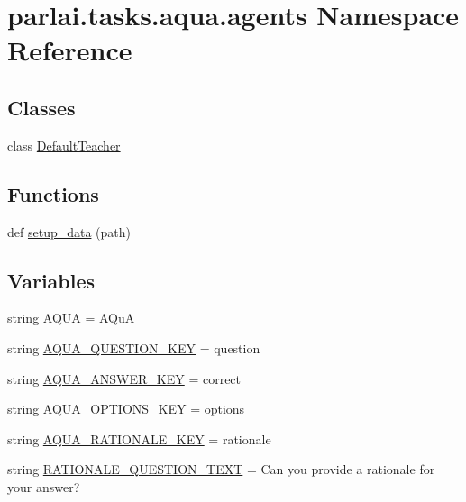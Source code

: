 \hypertarget{namespaceparlai_1_1tasks_1_1aqua_1_1agents}{}\section{parlai.\+tasks.\+aqua.\+agents Namespace Reference}
\label{namespaceparlai_1_1tasks_1_1aqua_1_1agents}
\subsection*{Classes}
\begin{DoxyCompactItemize}
\item 
class \hyperlink{classparlai_1_1tasks_1_1aqua_1_1agents_1_1DefaultTeacher}{Default\+Teacher}
\end{DoxyCompactItemize}
\subsection*{Functions}
\begin{DoxyCompactItemize}
\item 
def \hyperlink{namespaceparlai_1_1tasks_1_1aqua_1_1agents_a2d4e9f4e80d4edc0646c7e3d52be9f25}{setup\+\_\+data} (path)
\end{DoxyCompactItemize}
\subsection*{Variables}
\begin{DoxyCompactItemize}
\item 
string \hyperlink{namespaceparlai_1_1tasks_1_1aqua_1_1agents_ac1c607195fc8111cc32f83b710ae8ef8}{A\+Q\+UA} = \textquotesingle{}A\+QuA\textquotesingle{}
\item 
string \hyperlink{namespaceparlai_1_1tasks_1_1aqua_1_1agents_a6f4c29dfe00fcd7528ddc9f202dd71fc}{A\+Q\+U\+A\+\_\+\+Q\+U\+E\+S\+T\+I\+O\+N\+\_\+\+K\+EY} = \textquotesingle{}question\textquotesingle{}
\item 
string \hyperlink{namespaceparlai_1_1tasks_1_1aqua_1_1agents_af48618b7d7d59964edc4f51d6171f034}{A\+Q\+U\+A\+\_\+\+A\+N\+S\+W\+E\+R\+\_\+\+K\+EY} = \textquotesingle{}correct\textquotesingle{}
\item 
string \hyperlink{namespaceparlai_1_1tasks_1_1aqua_1_1agents_acbdbdda0de0642b8b977ef5638b21215}{A\+Q\+U\+A\+\_\+\+O\+P\+T\+I\+O\+N\+S\+\_\+\+K\+EY} = \textquotesingle{}options\textquotesingle{}
\item 
string \hyperlink{namespaceparlai_1_1tasks_1_1aqua_1_1agents_a03e0e9f2c5cb044de64f5cad4060a386}{A\+Q\+U\+A\+\_\+\+R\+A\+T\+I\+O\+N\+A\+L\+E\+\_\+\+K\+EY} = \textquotesingle{}rationale\textquotesingle{}
\item 
string \hyperlink{namespaceparlai_1_1tasks_1_1aqua_1_1agents_ab8474fa8e49958fff8955f9a49da2535}{R\+A\+T\+I\+O\+N\+A\+L\+E\+\_\+\+Q\+U\+E\+S\+T\+I\+O\+N\+\_\+\+T\+E\+XT} = \textquotesingle{}Can you provide a rationale for your answer?\textquotesingle{}
\end{DoxyCompactItemize}


